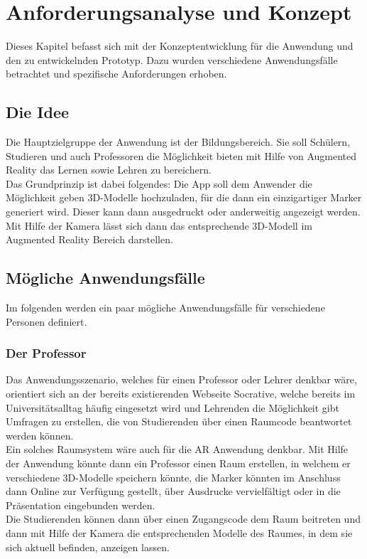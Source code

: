 \chapter{Anforderungsanalyse und Konzept}\label{chap:Konzept}
Dieses Kapitel befasst sich mit der Konzeptentwicklung für die Anwendung und den zu entwickelnden Prototyp. Dazu wurden verschiedene Anwendungsfälle betrachtet und spezifische Anforderungen erhoben.

\section{Die Idee}
Die Hauptzielgruppe der Anwendung ist der Bildungsbereich. Sie soll Schülern, Studieren und auch Professoren die Möglichkeit bieten mit Hilfe von Augmented Reality das Lernen sowie Lehren zu bereichern. \\
Das Grundprinzip ist dabei folgendes: Die App soll dem Anwender die Möglichkeit geben 3D-Modelle hochzuladen, für die dann ein einzigartiger Marker generiert wird. Dieser kann dann ausgedruckt oder anderweitig angezeigt werden. Mit Hilfe der Kamera lässt sich dann das entsprechende 3D-Modell im Augmented Reality Bereich darstellen.

\section{Mögliche Anwendungsfälle}
Im folgenden werden ein paar mögliche Anwendungsfälle für verschiedene Personen definiert.

\subsection{Der Professor}
Das Anwendungsszenario, welches für einen Professor oder Lehrer denkbar wäre, orientiert sich an der bereits existierenden Webseite Socrative, welche bereits im Universitätsalltag häufig eingesetzt wird und Lehrenden die Möglichkeit gibt Umfragen zu erstellen, die von Studierenden über einen Raumcode beantwortet werden können. \\
Ein solches Raumsystem wäre auch für die AR Anwendung denkbar.
Mit Hilfe der Anwendung könnte dann ein Professor einen Raum erstellen, in welchem er verschiedene 3D-Modelle speichern könnte, die Marker könnten im Anschluss dann Online zur Verfügung gestellt, über Ausdrucke vervielfältigt oder in die Präsentation eingebunden werden.\\
Die Studierenden können dann über einen Zugangscode dem Raum beitreten und dann mit Hilfe der Kamera die  entsprechenden Modelle des Raumes, in dem sie sich aktuell befinden, anzeigen lassen.

